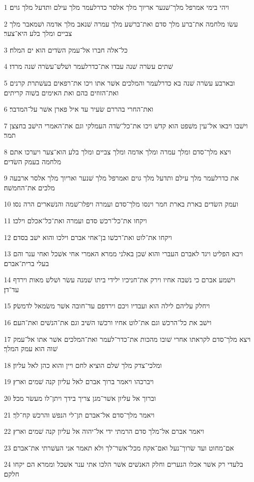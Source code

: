 \par 1 ויהי בימי אמרפל מלך־שׁנער אריוך מלך אלסר כדרלעמר מלך עילם ותדעל מלך גוים׃
\par 2 עשׂו מלחמה את־ברע מלך סדם ואת־ברשׁע מלך עמרה שׁנאב מלך אדמה ושׁמאבר מלך צביים ומלך בלע היא־צער׃
\par 3 כל־אלה חברו אל־עמק השׂדים הוא ים המלח׃
\par 4 שׁתים עשׂרה שׁנה עבדו את־כדרלעמר ושׁלשׁ־עשׂרה שׁנה מרדו׃
\par 5 ובארבע עשׂרה שׁנה בא כדרלעמר והמלכים אשׁר אתו ויכו את־רפאים בעשׁתרת קרנים ואת־הזוזים בהם ואת האימים בשׁוה קריתים׃
\par 6 ואת־החרי בהררם שׂעיר עד איל פארן אשׁר על־המדבר׃
\par 7 וישׁבו ויבאו אל־עין משׁפט הוא קדשׁ ויכו את־כל־שׂדה העמלקי וגם את־האמרי הישׁב בחצצן תמר׃
\par 8 ויצא מלך־סדם ומלך עמרה ומלך אדמה ומלך צביים ומלך בלע הוא־צער ויערכו אתם מלחמה בעמק השׂדים׃
\par 9 את כדרלעמר מלך עילם ותדעל מלך גוים ואמרפל מלך שׁנער ואריוך מלך אלסר ארבעה מלכים את־החמשׁה׃
\par 10 ועמק השׂדים בארת בארת חמר וינסו מלך־סדם ועמרה ויפלו־שׁמה והנשׁארים הרה נסו׃
\par 11 ויקחו את־כל־רכשׁ סדם ועמרה ואת־כל־אכלם וילכו׃
\par 12 ויקחו את־לוט ואת־רכשׁו בן־אחי אברם וילכו והוא ישׁב בסדם׃
\par 13 ויבא הפליט ויגד לאברם העברי והוא שׁכן באלני ממרא האמרי אחי אשׁכל ואחי ענר והם בעלי ברית־אברם׃
\par 14 וישׁמע אברם כי נשׁבה אחיו וירק את־חניכיו ילידי ביתו שׁמנה עשׂר ושׁלשׁ מאות וירדף עד־דן׃
\par 15 ויחלק עליהם לילה הוא ועבדיו ויכם וירדפם עד־חובה אשׁר משׂמאל לדמשׂק׃
\par 16 וישׁב את כל־הרכשׁ וגם את־לוט אחיו ורכשׁו השׁיב וגם את־הנשׁים ואת־העם׃
\par 17 ויצא מלך־סדם לקראתו אחרי שׁובו מהכות את־כדר־לעמר ואת־המלכים אשׁר אתו אל־עמק שׁוה הוא עמק המלך׃
\par 18 ומלכי־צדק מלך שׁלם הוציא לחם ויין והוא כהן לאל עליון׃
\par 19 ויברכהו ויאמר ברוך אברם לאל עליון קנה שׁמים וארץ׃
\par 20 וברוך אל עליון אשׁר־מגן צריך בידך ויתן־לו מעשׂר מכל׃
\par 21 ויאמר מלך־סדם אל־אברם תן־לי הנפשׁ והרכשׁ קח־לך׃
\par 22 ויאמר אברם אל־מלך סדם הרמתי ידי אל־יהוה אל עליון קנה שׁמים וארץ׃
\par 23 אם־מחוט ועד שׂרוך־נעל ואם־אקח מכל־אשׁר־לך ולא תאמר אני העשׁרתי את־אברם׃
\par 24 בלעדי רק אשׁר אכלו הנערים וחלק האנשׁים אשׁר הלכו אתי ענר אשׁכל וממרא הם יקחו חלקם׃

